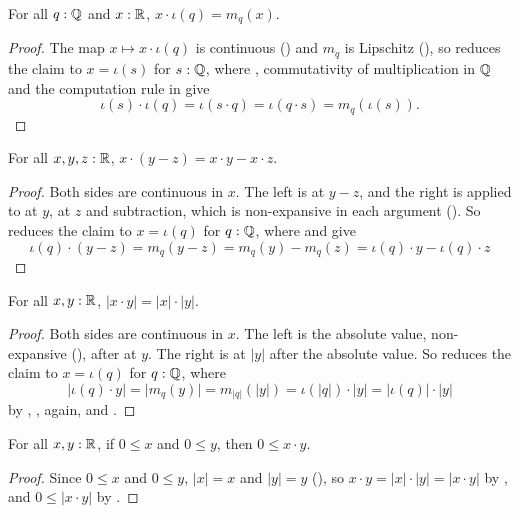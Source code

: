 \begin{lemma}
  \label{mulRatEqScale}
  For all $q : \mathbb{Q}$ and $x : \mathbb{R}$, $x \cdot \iota(q) = m_q(x)$.
\end{lemma}
\begin{proof}
  The map $x \mapsto x \cdot \iota(q)$ is continuous () and $m_q$ is Lipschitz (), so  reduces the claim to $x = \iota(s)$ for $s : \mathbb{Q}$, where , commutativity of multiplication in $\mathbb{Q}$ and the computation rule in  give \[
    \iota(s) \cdot \iota(q) = \iota(s \cdot q) = \iota(q \cdot s) = m_q(\iota(s)).
  \]
\end{proof}

\begin{lemma}
  \label{mulDistRSubReal}
  For all $x, y, z : \mathbb{R}$, $x \cdot (y - z) = x \cdot y - x \cdot z$.
\end{lemma}
\begin{proof}
  Both sides are continuous in $x$. The left is  at $y - z$, and the right is  applied to  at $y$,  at $z$ and subtraction, which is non-expansive in each argument (). So  reduces the claim to $x = \iota(q)$ for $q : \mathbb{Q}$, where  and  give
  \[
    \iota(q) \cdot (y - z) = m_q(y - z) = m_q(y) - m_q(z) = \iota(q) \cdot y - \iota(q) \cdot z
  \]
\end{proof}

\begin{lemma}
  \label{absMulReal}
  For all $x, y : \mathbb{R}$, $\lvert x \cdot y \rvert = \lvert x \rvert \cdot \lvert y \rvert$.
\end{lemma}
\begin{proof}
  Both sides are continuous in $x$. The left is the absolute value, non-expansive (), after  at $y$. The right is  at $\lvert y \rvert$ after the absolute value. So  reduces the claim to $x = \iota(q)$ for $q : \mathbb{Q}$, where
  \[
    \lvert \iota(q) \cdot y \rvert = \lvert m_q(y) \rvert = m_{\lvert q \rvert}(\lvert y \rvert) = \iota(\lvert q \rvert) \cdot \lvert y \rvert = \lvert \iota(q) \rvert \cdot \lvert y \rvert
  \]
  by , ,  again, and .
\end{proof}

\begin{lemma}[\agda{0≤·}]
  \label{mulNonNegReal}
  For all $x, y : \mathbb{R}$, if $0 \le x$ and $0 \le y$, then $0 \le x \cdot y$.
\end{lemma}
\begin{proof}
  Since $0 \le x$ and $0 \le y$, $\lvert x \rvert = x$ and $\lvert y \rvert = y$ (), so $x \cdot y = \lvert x \rvert \cdot \lvert y \rvert = \lvert x \cdot y \rvert$ by , and $0 \le \lvert x \cdot y \rvert$ by .
\end{proof}

